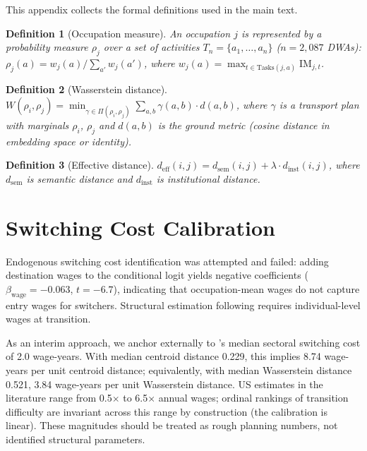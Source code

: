 \documentclass[12pt]{article}
\newtheorem{definition}{Definition}[section]
\begin{document}
This appendix collects the formal definitions used in the main text.

\begin{definition}[Occupation measure]
An occupation $j$ is represented by a probability measure $\rho_j$ over a set of activities $T_n = \{a_1, \ldots, a_n\}$ ($n = 2{,}087$ DWAs): $\rho_j(a) = w_j(a) / \sum_{a'} w_j(a')$, where $w_j(a) = \max_{t \in \mathrm{Tasks}(j,a)} \mathrm{IM}_{j,t}$.
\end{definition}

\begin{definition}[Wasserstein distance]
\label{def:wasserstein}
$W(\rho_i, \rho_j) = \min_{\gamma \in \Pi(\rho_i, \rho_j)} \sum_{a,b} \gamma(a,b) \cdot d(a,b)$,
where $\gamma$ is a transport plan with marginals $\rho_i$, $\rho_j$ and $d(a,b)$ is the ground metric (cosine distance in embedding space or identity).
\end{definition}

\begin{definition}[Effective distance]
\label{def:effective-distance}
$d_{\mathrm{eff}}(i,j) = d_{\mathrm{sem}}(i,j) + \lambda \cdot d_{\mathrm{inst}}(i,j)$,
where $d_{\mathrm{sem}}$ is semantic distance and $d_{\mathrm{inst}}$ is institutional distance.
\end{definition}


\section{Switching Cost Calibration}
\label{app:switching-costs}

Endogenous switching cost identification was attempted and failed: adding destination wages to the conditional logit yields negative coefficients ($\beta_{\mathrm{wage}} = -0.063$, $t = -6.7$), indicating that occupation-mean wages do not capture entry wages for switchers. Structural estimation following \citet{Traiberman2019} requires individual-level wages at transition.

As an interim approach, we anchor externally to \citet{DixCarneiro2014}'s median sectoral switching cost of 2.0 wage-years. With median centroid distance 0.229, this implies 8.74 wage-years per unit centroid distance; equivalently, with median Wasserstein distance 0.521, 3.84 wage-years per unit Wasserstein distance. US estimates in the literature range from 0.5$\times$ to 6.5$\times$ annual wages; ordinal rankings of transition difficulty are invariant across this range by construction (the calibration is linear). These magnitudes should be treated as rough planning numbers, not identified structural parameters.
\end{document}
